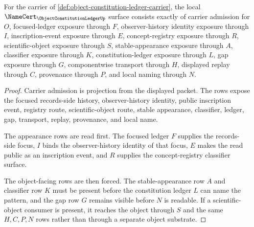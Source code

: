 \begin{theorem}
\label{thm:object-constitution-ledger-namecert-obligations}
For the carrier of \autoref{def:object-constitution-ledger-carrier}, the local $\NameCert_{\ObjectConstitutionLedgerUp}$ surface consists exactly of carrier admission for $O$, focused-ledger exposure through $F$, observer-history identity exposure through $I$, inscription-event exposure through $E$, concept-registry exposure through $R$, scientific-object exposure through $S$, stable-appearance exposure through $A$, classifier exposure through $K$, constitution-ledger exposure through $L$, gap exposure through $G$, componentwise transport through $H$, displayed replay through $C$, provenance through $P$, and local naming through $N$.
\end{theorem}
\begin{proof}
Carrier admission is projection from the displayed packet. The rows expose the focused records-side history, observer-history identity, public inscription event, registry route, scientific-object route, stable appearance, classifier, ledger, gap, transport, replay, provenance, and local name.

The appearance rows are read first. The focused ledger $F$ supplies the records-side focus, $I$ binds the observer-history identity of that focus, $E$ makes the read public as an inscription event, and $R$ supplies the concept-registry classifier surface.

The object-facing rows are then forced. The stable-appearance row $A$ and classifier row $K$ must be present before the constitution ledger $L$ can name the pattern, and the gap row $G$ remains visible before $N$ is readable. If a scientific-object consumer is present, it reaches the object through $S$ and the same $H,C,P,N$ rows rather than through a separate object substrate.
\end{proof}

